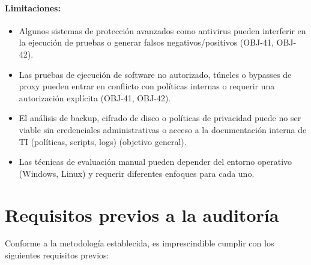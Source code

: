 \documentclass[a4paper, 10pt]{article}
\begin{document}
\paragraph{Limitaciones:}
\begin{itemize}
    \item Algunos sistemas de protección avanzados como antivirus pueden interferir en la ejecución de pruebas o generar falsos negativos/positivos (OBJ-41, OBJ-42).
    \item Las pruebas de ejecución de software no autorizado, túneles o bypasses de proxy pueden entrar en conflicto con políticas internas o requerir una autorización explícita (OBJ-41, OBJ-42).
    \item El análisis de backup, cifrado de disco o políticas de privacidad puede no ser viable sin credenciales administrativas o acceso a la documentación interna de TI (políticas, scripts, logs) (objetivo general).
    \item Las técnicas de evaluación manual pueden depender del entorno operativo (Windows, Linux) y requerir diferentes enfoques para cada uno.
\end{itemize}


\clearpage



















\section{Requisitos previos a la auditoría}
\par\vspace{0.5cm}
Conforme a la metodología establecida, es imprescindible cumplir con los siguientes requisitos previos:
\end{document}
